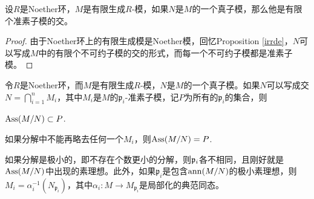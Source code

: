 \begin{pro}
设$R$是Noether环，$M$是有限生成$R$-模，如果$N$是$M$的一个真子模，那么他是有限个准素子模的交。
\end{pro}

\begin{proof}
由于Noether环上的有限生成模是Noether模，回忆Proposition \ref{irrde}，$N$可以写成$M$中的有限个不可约子模的交的形式，而每一个不可约子模都是准素子模。
\end{proof}

\begin{thm}\label{thm:5.2.17}
	令$R$是Noether环，而$M$是有限生成$R$-模，$N$是$M$的一个真子模。如果$N$可以写成交$N=\bigcap_{i=1}^n M_i$，其中$M_i$是$M$的$\mathfrak p_i$-准素子模，记$P$为所有的$\mathfrak p_i$的集合，则
	\begin{compactenum}
		\item $\operatorname{Ass}(M/N)\subset P$.
		\item 如果分解中不能再略去任何一个$M_i$，则$\operatorname{Ass}(M/N) = P$.
		\item 如果分解是极小的，即不存在个数更小的分解，则$\mathfrak{p}_i$各不相同，且刚好就是$\operatorname{Ass}(M/N)$中出现的素理想。此外，如果$\mathfrak p_i$是包含$\operatorname{ann}(M/N)$的极小素理想，则$M_i=\alpha_i^{-1}(N_{\mathfrak p_i})$，其中$\alpha_i:M\to M_{\mathfrak p_i}$是局部化的典范同态。
	\end{compactenum}
\end{thm}

